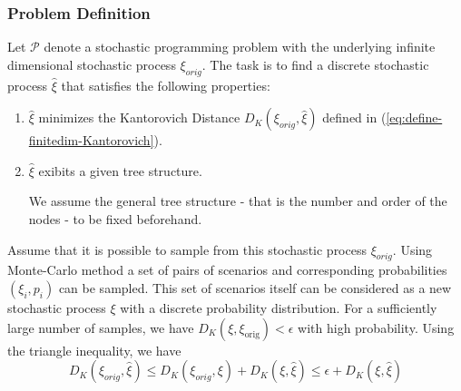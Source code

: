 \subsubsection{Problem Definition}
Let $\mathcal{P}$ denote a stochastic programming problem with the underlying infinite dimensional stochastic process $\xi_{orig}$.
The task is to find a discrete stochastic process $\hat{\xi}$ that satisfies the following properties:
\begin{enumerate}
\item $\hat{\xi}$ minimizes the Kantorovich Distance $D_K(\xi_{orig},\hat{\xi})$ defined in (\ref{eq:define-finitedim-Kantorovich}).
\item $\hat{\xi}$ exibits a given tree structure.
\begin{comment}
  (see figure \ref{fig:generic-tree-structure}
\end{comment}
We assume the general tree structure - that is the number and order of the nodes - to be fixed beforehand. 
\end{enumerate}
Assume that it is possible to sample from this stochastic process $\xi_{orig}$.
Using Monte-Carlo method a set of pairs of scenarios and corresponding probabilities $(\xi_i,p_i)$ can be sampled.
This set of scenarios itself can be considered as a new stochastic process $\xi$ with a discrete probability distribution.
For a sufficiently large number of samples, we have $D_K(\xi,\xi_{\mathrm{orig}})<\epsilon$ with high probability.
Using the triangle inequality, we have
\begin{equation}
  \label{eq:triangle-montecarlo-kantoro}
  D_K(\xi_{orig},\hat{\xi}) \leq D_K(\xi_{orig},\xi) + D_K(\xi, \hat{\xi}) \leq \epsilon + D_K(\xi, \hat{\xi})
\end{equation}

